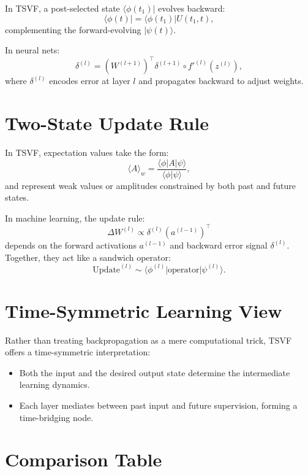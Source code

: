 \documentclass[../main.tex]{subfiles} %
\begin{document}
{{{{{{In TSVF, a post-selected state \(\langle\phi(t_1)|\) evolves backward:
\[
\langle \phi(t)| = \langle \phi(t_1)| U(t_1, t),
\]
complementing the forward-evolving \(|\psi(t)\rangle\).

In neural nets:
\[
\delta^{(l)} = (W^{(l+1)})^\top \delta^{(l+1)} \circ f'^{(l)}(z^{(l)}),
\]
where \(\delta^{(l)}\) encodes error at layer \(l\) and propagates backward to adjust weights.

\section{Two-State Update Rule}

In TSVF, expectation values take the form:
\[
\langle A \rangle_w = \frac{\langle \phi | A | \psi \rangle}{\langle \phi | \psi \rangle},
\]
and represent weak values or amplitudes constrained by both past and future states.

In machine learning, the update rule:
\[
\Delta W^{(l)} \propto \delta^{(l)} (a^{(l-1)})^\top
\]
depends on the forward activations \(a^{(l-1)}\) and backward error signal \(\delta^{(l)}\). Together, they act like a sandwich operator:
\[
\text{Update}^{(l)} \sim \langle \phi^{(l)} | \text{operator} | \psi^{(l)} \rangle.
\]

\section{Time-Symmetric Learning View}

Rather than treating backpropagation as a mere computational trick, TSVF offers a time-symmetric interpretation:

\begin{itemize}
  \item Both the input and the desired output state determine the intermediate learning dynamics.
  \item Each layer mediates between past input and future supervision, forming a time-bridging node.
\end{itemize}

\section{Comparison Table}

}}}}}}
\end{document}

